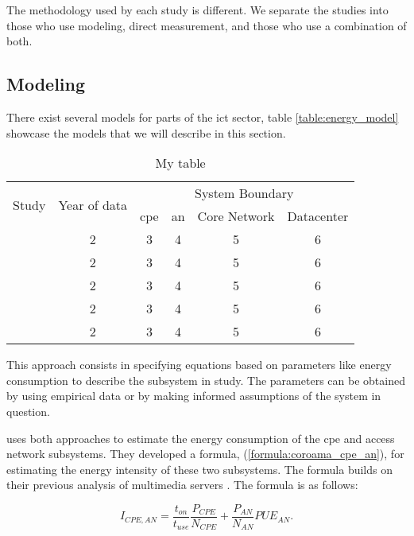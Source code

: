 The methodology used by each study is different. We separate the studies into those who use modeling, direct measurement, and those who use a combination of both.

\subsection{Modeling}

There exist several models for parts of the \ac{ict} sector, table \ref{table:energy_model} showcase the models that we will describe in this section.

\begin{table}
\caption{My table}
\label{table:energy_models}
\begin{center}
    \begin{tabular}{|| c | c | c | c | c | c ||}
        \hline
        \multirow{2}{*}{Study} & \multirow{2}{*}{Year of data} & \multicolumn{4}{c||}{System Boundary} \\ \cline{3-6}
        & & \ac{cpe} & \ac{an} & Core Network & Datacenter \\
        \hline
        \citet{Coroama2015} & 2 & 3 & 4 & 5 & 6  \\ \hline
        \citet{Schien2015} & 2 & 3 & 4 & 5 & 6  \\ \hline
        \citet{Tall2014} & 2 & 3 & 4 & 5 & 6  \\ \hline
        \citet{USReport2016} & 2 & 3 & 4 & 5 & 6  \\ \hline
        \citet{Li2014} & 2 & 3 & 4 & 5 & 6  \\ \hline
    \end{tabular}
\end{center}
\end{table}

This approach consists in specifying equations based on parameters like energy consumption to describe the subsystem in study. The parameters can be obtained by using empirical data or by making informed assumptions of the system in question. 

\citet{Coroama2015} uses both approaches to estimate the energy consumption of the \ac{cpe} and access network subsystems. They developed a formula, (\ref{formula:coroama_cpe_an}), for estimating the energy intensity of these two subsystems. The formula builds on their previous analysis of multimedia servers \citet{Schien2013}. The formula is as follows: 

\begin{equation}
\label{formula:coroama_cpe_an}
    I_{CPE,AN} = \frac{t_{on}}{t_{use}} \frac{P_{CPE}}{N_{CPE}} + \frac{P_{AN}}{N_{AN}} PUE_{AN}.
\end{equation}

